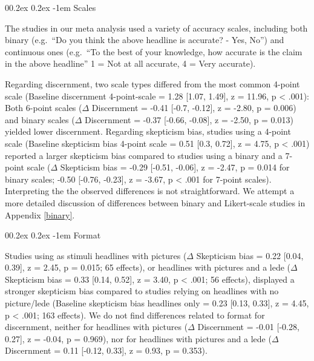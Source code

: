 \documentclass[
  man]{apa6}
\makeatletter
\let\oldparagraph\paragraph
\renewcommand{\paragraph}{
    \@ifstar
      \xxxParagraphStar
      \xxxParagraphNoStar
  }
\newcommand{\xxxParagraphStar}[1]{\oldparagraph*{#1}\mbox{}}
\newcommand{\xxxParagraphNoStar}[1]{\oldparagraph{#1}\mbox{}}
\renewcommand{\paragraph}{\@startsection{paragraph}{4}{\parindent}%
  {0\baselineskip \@plus 0.2ex \@minus 0.2ex}%
  {-1em}%
  {\normalfont\normalsize\bfseries\itshape\typesectitle}}
\makeatother
\begin{document}
\paragraph{Scales}\label{scales}

The studies in our meta analysis used a variety of accuracy scales, including both binary (e.g.~``Do you think the above headline is accurate? - Yes, No'') and continuous ones (e.g.~``To the best of your knowledge, how accurate is the claim in the above headline'' 1 = Not at all accurate, 4 = Very accurate).

Regarding discernment, two scale types differed from the most common 4-point scale (Baseline discernment 4-point-scale = 1.28 {[}1.07, 1.49{]}, z = 11.96, p \textless{} .001): Both 6-point scales (\(\Delta\) Discernment = -0.41 {[}-0.7, -0.12{]}, z = -2.80, p = 0.006) and binary scales (\(\Delta\) Discernment = -0.37 {[}-0.66, -0.08{]}, z = -2.50, p = 0.013) yielded lower discernment. Regarding skepticism bias, studies using a 4-point scale (Baseline skepticism bias 4-point scale = 0.51 {[}0.3, 0.72{]}, z = 4.75, p \textless{} .001) reported a larger skepticism bias compared to studies using a binary and a 7-point scale (\(\Delta\) Skepticism bias = -0.29 {[}-0.51, -0.06{]}, z = -2.47, p = 0.014 for binary scales; -0.50 {[}-0.76, -0.23{]}, z = -3.67, p \textless{} .001 for 7-point scales). Interpreting the the observed differences is not straightforward. We attempt a more detailed discussion of differences between binary and Likert-scale studies in Appendix \ref{binary}.

\paragraph{Format}\label{format}

Studies using as stimuli headlines with pictures (\(\Delta\) Skepticism bias = 0.22 {[}0.04, 0.39{]}, z = 2.45, p = 0.015; 65 effects), or headlines with pictures and a lede (\(\Delta\) Skepticism bias = 0.33 {[}0.14, 0.52{]}, z = 3.40, p \textless{} .001; 56 effects), displayed a stronger skepticism bias compared to studies relying on headlines with no picture/lede (Baseline skepticism bias headlines only = 0.23 {[}0.13, 0.33{]}, z = 4.45, p \textless{} .001; 163 effects). We do not find differences related to format for discernment, neither for headlines with pictures (\(\Delta\) Discernment = -0.01 {[}-0.28, 0.27{]}, z = -0.04, p = 0.969), nor for headlines with pictures and a lede (\(\Delta\) Discernment = 0.11 {[}-0.12, 0.33{]}, z = 0.93, p = 0.353).
\end{document}
